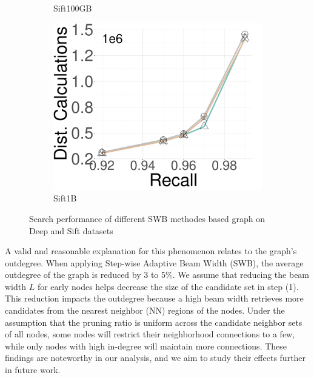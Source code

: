 \begin{figure}[ht]
\begin{subfigure}[b]{0.28\textwidth}
                \caption{Sift100GB}
        \label{fig:SWBsearch:_Time}
    \end{subfigure}
    \hspace{0.4cm}
             \begin{subfigure}[b]{0.28\textwidth}
                 \captionsetup{justification=centering}
	\centering	
                \includegraphics[width=\textwidth]{../img/oigas/SWB/search/1B/sift_DC.pdf}
        \caption{Sift1B}
        \label{fig:SWBsearch:_Time}
    \end{subfigure}
    \caption{Search performance of different SWB methodes based graph on Deep and Sift datasets}
    \label{fig:SWBsearch}
\end{figure}

A valid and reasonable explanation for this phenomenon relates to the graph's outdegree. When applying Step-wise Adaptive Beam Width (SWB), the average outdegree of the graph is reduced by 3 to 5\%. We assume that reducing the beam width \( L \) for early nodes helps decrease the size of the candidate set in step (1). This reduction impacts the outdegree because a high beam width retrieves more candidates from the nearest neighbor (NN) regions of the nodes. Under the assumption that the pruning ratio is uniform across the candidate neighbor sets of all nodes, some nodes will restrict their neighborhood connections to a few, while only nodes with high in-degree will maintain more connections. These findings are noteworthy in our analysis, and we aim to study their effects further in future work.

